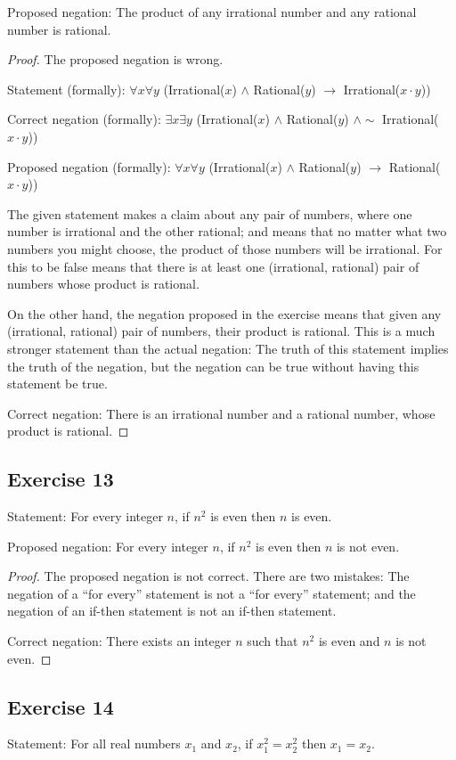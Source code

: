 \documentclass[14pt]{extarticle}
\newcommand{\fa}{\forall}
\newcommand{\te}{\exists}
\begin{document}
Proposed negation: The product of any irrational number and any rational number is rational.

\begin{proof}
The proposed negation is wrong.

Statement (formally): $\fa x \fa y$ (Irrational($x$) $\wedge$ Rational($y$) $\to$ Irrational($x \cdot y$))

Correct negation (formally): $\te x \te y$ (Irrational($x$) $\wedge$ Rational($y$) $\wedge\sim$ Irrational($x \cdot y$))

Proposed negation (formally): $\fa x \fa y$ (Irrational($x$) $\wedge$ Rational($y$) $\to$ Rational($x \cdot y$))

The given statement makes a claim about any pair of numbers, where one number is irrational and the other rational; and means that no matter what two numbers you might choose, the product of those numbers will be irrational. For this to be false means that there is at least one (irrational, rational) pair of numbers whose product is rational. 

On the other hand, the negation proposed in the exercise means that given any (irrational, rational) pair of numbers, their product is rational. This is a much stronger statement than the actual negation: The truth of this statement implies the truth of the negation, but the negation can be true without having this statement be true.

Correct negation: There is an irrational number and a rational number, whose product is rational.
\end{proof}

\subsection{Exercise 13}
Statement: For every integer $n$, if $n^2$ is even then $n$ is even.

Proposed negation: For every integer $n$, if $n^2$ is even then $n$ is not even.

\begin{proof}
The proposed negation is not correct. There are two mistakes: The negation of a “for every” statement is not a “for every” statement; and the negation of an if-then statement is not an if-then statement. 

Correct negation: There exists an integer $n$ such that $n^2$ is even and $n$ is not even.
\end{proof}

\subsection{Exercise 14}
Statement: For all real numbers $x_1$ and $x_2$, if $x_1^2 = x_2^2$ then $x_1 = x_2$.
\end{document}
